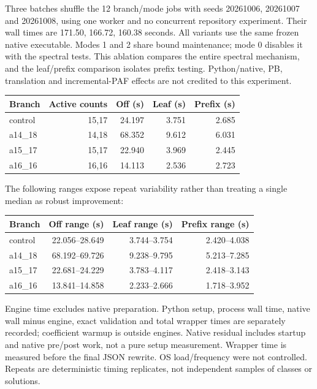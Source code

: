 \documentclass[11pt]{article}
\begin{document}
Three batches shuffle the 12 branch/mode jobs with seeds 20261006,
20261007 and 20261008, using one worker and no concurrent repository
experiment. Their wall times are 171.50, 166.72, 160.38 seconds.
All variants use the same frozen native executable. Modes 1 and 2 share
bound maintenance; mode 0 disables it with the spectral tests. This ablation
compares the entire spectral mechanism, and the leaf/prefix comparison
isolates prefix testing. Python/native, PB, translation and incremental-PAF
effects are not credited to this experiment.

\begin{center}
\begin{tabular}{lrrrr}
\toprule
Branch & Active counts & Off (s) & Leaf (s) & Prefix (s)\\
\midrule
control & 15,17 & 24.197 & 3.751 & 2.685\\
a14\_18 & 14,18 & 68.352 & 9.612 & 6.031\\
a15\_17 & 15,17 & 22.940 & 3.969 & 2.445\\
a16\_16 & 16,16 & 14.113 & 2.536 & 2.723\\
\bottomrule
\end{tabular}
\end{center}
The following ranges expose repeat variability rather than treating a
single median as robust improvement:
\begin{center}
\begin{tabular}{lrrr}
\toprule
Branch & Off range (s) & Leaf range (s) & Prefix range (s)\\
\midrule
control & 22.056--28.649 & 3.744--3.754 & 2.420--4.038\\
a14\_18 & 68.192--69.726 & 9.238--9.795 & 5.213--7.285\\
a15\_17 & 22.681--24.229 & 3.783--4.117 & 2.418--3.143\\
a16\_16 & 13.841--14.858 & 2.233--2.666 & 1.718--3.952\\
\bottomrule
\end{tabular}
\end{center}
Engine time excludes native preparation. Python setup, process wall time,
native wall minus engine, exact validation and total wrapper times are
separately recorded; coefficient warmup is outside engines. Native residual
includes startup and native pre/post work, not a pure setup measurement.
Wrapper time is measured before the final JSON rewrite. OS load/frequency
were not controlled. Repeats are deterministic timing replicates, not
independent samples of classes or solutions.
\end{document}
